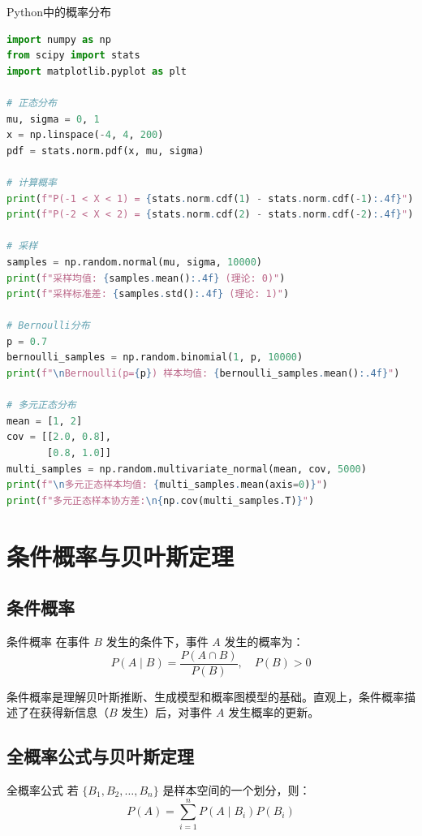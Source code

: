 \begin{mycode}{Python中的概率分布}
\begin{lstlisting}[language=Python]
import numpy as np
from scipy import stats
import matplotlib.pyplot as plt

# 正态分布
mu, sigma = 0, 1
x = np.linspace(-4, 4, 200)
pdf = stats.norm.pdf(x, mu, sigma)

# 计算概率
print(f"P(-1 < X < 1) = {stats.norm.cdf(1) - stats.norm.cdf(-1):.4f}")
print(f"P(-2 < X < 2) = {stats.norm.cdf(2) - stats.norm.cdf(-2):.4f}")

# 采样
samples = np.random.normal(mu, sigma, 10000)
print(f"采样均值: {samples.mean():.4f} (理论: 0)")
print(f"采样标准差: {samples.std():.4f} (理论: 1)")

# Bernoulli分布
p = 0.7
bernoulli_samples = np.random.binomial(1, p, 10000)
print(f"\nBernoulli(p={p}) 样本均值: {bernoulli_samples.mean():.4f}")

# 多元正态分布
mean = [1, 2]
cov = [[2.0, 0.8],
       [0.8, 1.0]]
multi_samples = np.random.multivariate_normal(mean, cov, 5000)
print(f"\n多元正态样本均值: {multi_samples.mean(axis=0)}")
print(f"多元正态样本协方差:\n{np.cov(multi_samples.T)}")
\end{lstlisting}
\end{mycode}

\section{条件概率与贝叶斯定理}

\subsection{条件概率}

\begin{mydefinition}{条件概率}
在事件 $B$ 发生的条件下，事件 $A$ 发生的概率为：
\[
P(A\mid B) = \frac{P(A\cap B)}{P(B)}, \quad P(B)>0
\]
\end{mydefinition}

条件概率是理解贝叶斯推断、生成模型和概率图模型的基础。直观上，条件概率描述了在获得新信息（$B$ 发生）后，对事件 $A$ 发生概率的更新。

\subsection{全概率公式与贝叶斯定理}

\begin{myTheorem}{全概率公式}
若 $\{B_1,B_2,\ldots,B_n\}$ 是样本空间的一个划分，则：
\[
P(A) = \sum_{i=1}^{n} P(A\mid B_i)P(B_i)
\]
\end{myTheorem}

